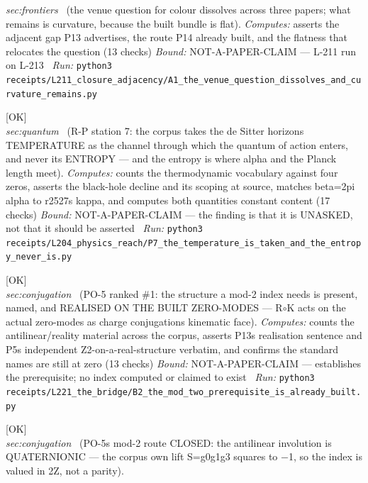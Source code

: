 \begin{description}
\textit{sec:frontiers} \ (the venue question for colour dissolves across three papers; what remains is curvature, because the built bundle is flat). 
\emph{Computes:} asserts the adjacent gap P13 advertises, the route P14 already built, and the flatness that relocates the question (13 checks)
 \emph{Bound:} NOT-A-PAPER-CLAIM --- L-211 run on L-213
\ \emph{Run:} \texttt{python3 receipts/L211\_closure\_adjacency/A1\_the\_venue\_question\_dissolves\_and\_curvature\_remains.py}
\item[\label{rcpt:P7_the_temperature_is_taken_and_the_entropy_never_is}\textbf{}\quad\texttt{P7\_the\_temperature\_is\_taken\_and\_the\_entropy\_never\_is}]\hfill\textsf{[OK]}\\
\textit{sec:quantum} \ (R-P station 7: the corpus takes the de Sitter horizons TEMPERATURE as the channel through which the quantum of action enters, and never its ENTROPY --- and the entropy is where alpha and the Planck length meet). 
\emph{Computes:} counts the thermodynamic vocabulary against four zeros, asserts the black-hole decline and its scoping at source, matches beta=2pi alpha to r2527s kappa, and computes both quantities constant content (17 checks)
 \emph{Bound:} NOT-A-PAPER-CLAIM --- the finding is that it is UNASKED, not that it should be asserted
\ \emph{Run:} \texttt{python3 receipts/L204\_physics\_reach/P7\_the\_temperature\_is\_taken\_and\_the\_entropy\_never\_is.py}
\item[\label{rcpt:B2_the_mod_two_prerequisite_is_already_built}\textbf{}\quad\texttt{B2\_the\_mod\_two\_prerequisite\_is\_already\_built}]\hfill\textsf{[OK]}\\
\textit{sec:conjugation} \ (PO-5 ranked \#1: the structure a mod-2 index needs is present, named, and REALISED ON THE BUILT ZERO-MODES --- R\ensuremath{\circ}K acts on the actual zero-modes as charge conjugations kinematic face). 
\emph{Computes:} counts the antilinear/reality material across the corpus, asserts P13s realisation sentence and P5s independent Z2-on-a-real-structure verbatim, and confirms the standard names are still at zero (13 checks)
 \emph{Bound:} NOT-A-PAPER-CLAIM --- establishes the prerequisite; no index computed or claimed to exist
\ \emph{Run:} \texttt{python3 receipts/L221\_the\_bridge/B2\_the\_mod\_two\_prerequisite\_is\_already\_built.py}
\item[\label{rcpt:B3_the_involution_is_quaternionic_not_real}\textbf{}\quad\texttt{B3\_the\_involution\_is\_quaternionic\_not\_real}]\hfill\textsf{[OK]}\\
\textit{sec:conjugation} \ (PO-5s mod-2 route CLOSED: the antilinear involution is QUATERNIONIC --- the corpus own lift S=g0g1g3 squares to \ensuremath{-}1, so the index is valued in 2Z, not a parity). 

\end{description}
